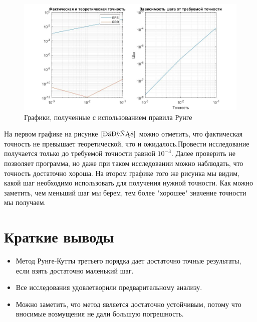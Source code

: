 \documentclass[a4paper]{article}
\begin{document}
\begin{figure}[h!]
\begin{center}
\includegraphics[scale=0.5]{правило рунге.jpg} 
\end{center}
\caption{Графики, полученные с использованием правила Рунге} \label{Рис8}
\end{figure}
На первом графике на рисунке $\ref{Рис8}$ можно отметить, что фактическая точность не превышает теоретической, что и ожидалось.Провести исследование получается только до требуемой точности равной $10^{-3}$. Далее проверить не позволяет программа, но даже при таком исследовании можно наблюдать, что точность достаточно хороша.  На втором графике того же рисунка мы видим, какой шаг необходимо использовать для получения нужной точности. Как можно заметить, чем меньший шаг мы берем, тем более "хорошее" значение точности мы получаем.\\


\newpage
\section{Краткие выводы} 

\begin{itemize}
  \item Метод Рунге-Кутты третьего порядка дает достаточно точные результаты, если взять достаточно маленький шаг.
  \item Все исследования удовлетворили предварительному анализу.
  \item Можно заметить, что метод является достаточно устойчивым, потому что вносимые возмущения не дали большую погрешность. 
  \end{itemize}
\end{document}
